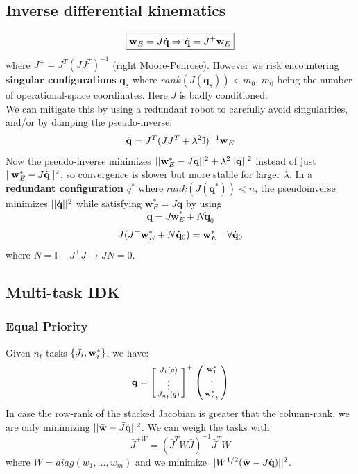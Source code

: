 \documentclass[a4paper, 8pt]{extarticle}
\begin{document}
\begin{multicols*}{3}
\subsection{Inverse differential kinematics}
$$\boxed{ \textbf{w}_E = J\dot{\mathbf q} \Rightarrow
\dot{\mathbf q} = J^+ \textbf w_E}$$
where $J^+ = J^T(JJ^T)^{-1}$ (right Moore-Penrose). However we risk encountering \textbf{singular configurations} $\mathbf q_s$ where $rank(J(\mathbf q_s)) < m_0$, $m_0$ being the number of operational-space coordinates. Here $J$ is badly conditioned.\\
We can mitigate this by using a redundant robot to carefully avoid singularities, and/or by damping the pseudo-inverse:
$$\dot{\mathbf q} = J^T(JJ^T + \lambda^2\mathbb{I})^{-1} \textbf w_E$$
Now the pseudo-inverse minimizes $||\textbf w_E^* - J\dot{\textbf q}||^2 + \lambda^2||\dot{\mathbf q}||^2$ instead of just $||\textbf w_E^* - J\dot{\textbf q}||^2$, so convergence is slower but more stable for larger $\lambda$.
In a \textbf{redundant configuration} $q^*$ where $rank(J(\mathbf q^*)) < n$, the pseudoinverse minimizes $||\dot{\textbf q}||^2$ while satisfying $\textbf{w}_E^* = J\dot{\mathbf q}$ by using
$$ \dot{\mathbf q}=J\textbf{w}_E^*+N\dot{\mathbf q}_0$$
$$J(J^+\textbf w_E^* + N\dot{\mathbf q}_0) = \textbf w_E^* \quad \forall\dot{\mathbf q}_0$$
where $\boxed{N = \mathbb I - J^+J \longrightarrow JN=0}$.



\subsection{Multi-task IDK}
\subsubsection*{Equal Priority}
Given $n_t$ tasks $\{J_i, \textbf w^*_i\}$, we have:
$$\dot{\textbf q} = \left[\begin{smallmatrix}
J_1(q)\\ \vdots \\ J_{n_t}(q)
\end{smallmatrix}\right]^+  \left(\begin{smallmatrix}
\textbf w_1^* \\ \vdots \\ \textbf w_{n_t}^*
\end{smallmatrix}\right)$$
In case the row-rank of the stacked Jacobian is greater that the column-rank, we are only minimizing $||\bar{\textbf w} - \bar J\dot{\textbf q}||^2$. We can weigh the tasks with
$$\bar J^{+W} = (\bar J^T W \bar J)^{-1}\bar J^{T} W$$
where $W = diag(w_1,...,w_m)$ and we minimize $||W^{1/2}(\bar{\textbf w} - \bar J\dot{\textbf q})||^2$.



\end{multicols*}
\end{document}
